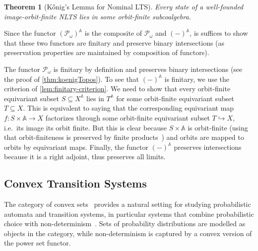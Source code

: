 \documentclass[10pt,a4paper]{article}
\newtheorem{theorem}{Theorem}[section]
\theoremstyle{definition}
\theoremstyle{remark}
\numberwithin{equation}{section}
\newcommand{\Konig}{Kőnig}
\newcommand{\Powf}{\mathcal{P}_{\omega}}
\newcommand{\seq}{\subseteq}
\newcommand{\subto}{\hookrightarrow}
\newenvironment{proofhere}[2][Proof of]{    \proof{#1~\autoref{#2}}    }{  \endproof  \par}
\newenvironment{proofappendix}[2][Proof of]{    \begin{proofhere}[#1]{#2}\label{#2:proof}
  }{    \end{proofhere}
  }
\theoremstyle{plain}
\theoremstyle{definition}
\newcommand{\At}{\mathbb{A}}
\begin{document}
\begin{theorem}[\Konig's Lemma for Nominal LTS]\label{thm:koenigNomGraph}
  Every state of a well-founded image-orbit-finite NLTS lies in some orbit-finite subcoalgebra.
\end{theorem}
\begin{proofappendix}{thm:koenigNomGraph}
Since the functor $(\Powf)^\At$ is the composite of $\Powf$ and $(-)^\At$, is suffices to show that these two functors are finitary and preserve binary intersections (as preservation properties are maintained by composition of functors).

The functor $\Powf$ is finitary by definition and preserves binary intersections (see the proof of \autoref{thm:koenigTopos}). To see that $(-)^\At$ is finitary, we use the criterion of \autoref{lem:finitary-criterion}. We need to show that every orbit-finite equivariant subset $S\seq X^\At$ lies in $T^\At$ for some orbit-finite equivariant subset $T\seq X$. This is equivalent to saying that the corresponding equivariant map $f\colon S\times \At \to X$ factorizes through some orbit-finite equivariant subset $T\subto X$, i.e.\ its image its orbit finite. But this is clear because $S\times \At$ is orbit-finite (using that orbit-finiteness is preserved by finite products~\cite{pitts13}) and orbits are mapped to orbits by equivariant maps. Finally, the functor $(-)^\At$ preserves intersections because it is a right adjoint, thus preserves all limits.   
\end{proofappendix}

\subsection{Convex Transition Systems}
\label{sec:convex}
The category of {convex sets}~\cite{stone-49} provides a natural setting for studying probabilistic automata and transition systems, in particular systems that combine probabilistic choice with non-determinism~\cite{bss17,mv20,msv21,bsv22}. Sets of probability distributions are modelled as objects in the category, while non-determinism is captured by a convex version of the power set functor. 
\end{document}
